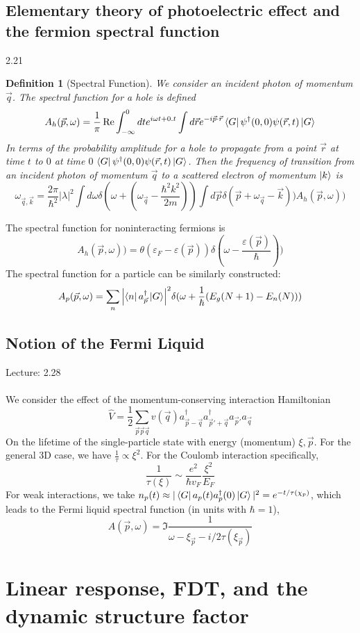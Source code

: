 \documentclass[10pt]{article}
\newtheorem*{defn}{Definition}
\newcommand{\Lec}[1]{Lecture: #1 \\ \\ \noindent}
\begin{document}
\subsection{Elementary theory of photoelectric effect and the fermion spectral function}
2.21\\
\begin{defn}[Spectral Function]
We consider an incident photon of momentum $\vec q$. The spectral function for a hole is defined
$$
A_h(\vec p, \omega) = \frac{1}{\pi}\Re \int_{-\infty}^0 dt e^{i\omega t + 0.t} \int d\vec r e^{-i\vec p \cdot \vec r} \bra{G} \psi^\dagger(0,0)\psi(\vec r, t)\ket{G}
$$
In terms of the probability amplitude for a hole to propagate from a point $\vec r$ at time $t$ to $0$ at time $0$ $\bra G \psi^\dagger(0,0) \psi(\vec r, t)\ket{G}$. Then the frequency of transition from an incident photon of momentum $\vec q$ to a scattered electron of momentum $\ket k$ is
$$
\omega_{\vec q, \vec k} = \frac{2\pi}{\hbar^2}|\lambda|^2 \int d\omega\delta(\omega + (\omega_{\vec q}-\frac{\hbar^2k^2}{2m}))\int d\vec p \delta(\vec p +\omega_{\vec q}-\vec k)) A_h(\vec p, \omega))
$$
\end{defn}
The spectral function for noninteracting fermions is
$$
A_h(\vec p, \omega)) = \theta(\varepsilon_F - \varepsilon(\vec p))\delta(\omega-\frac{\varepsilon(\vec p)}{\hbar}))
$$
The spectral function for a particle can be similarly constructed:
$$
A_p(\vec p, \omega) = \sum_n\qty|\bra{n}a_{\vec p}^\dagger \ket{G}|^2 \delta(\omega + \frac{1}{\hbar}(E_g(N+1)-E_n(N)))
$$
\subsection{Notion of the Fermi Liquid}
\Lec{2.28}
We consider the effect of the momentum-conserving interaction Hamiltonian
$$
\hat V = \frac{1}{2}\sum_{\vec p \vec p \vec q}v(\vec q) a_{\vec p - \vec q}^\dagger a^\dagger_{\vec p' + \vec q}a_{\vec p'}a_{\vec q}
$$
On the lifetime of the single-particle state with energy (momentum) $\xi, \vec p$. For the general 3D case, we have $\frac{1}{\tau} \propto \xi^2$. For the Coulomb interaction specifically,
$$
\frac{1}{\tau(\xi)} \sim \frac{e^2}{\hbar v_F}\frac{\xi^2}{E_F}
$$
For weak interactions, we take $n_p(t) \approx |\bra{G} a_p(t)a_p^\dagger(0) \ket{G}|^2 = e^{-t/\tau(\chi_p)}$, which leads to the Fermi liquid spectral function (in units with $\hbar = 1$),
$$
A(\vec p , \omega) = \Im \frac{1}{\omega-\xi_{\vec p} - i/2\tau(\xi_{\vec p})}
$$

\section{Linear response, FDT, and the dynamic structure factor}
\end{document}
